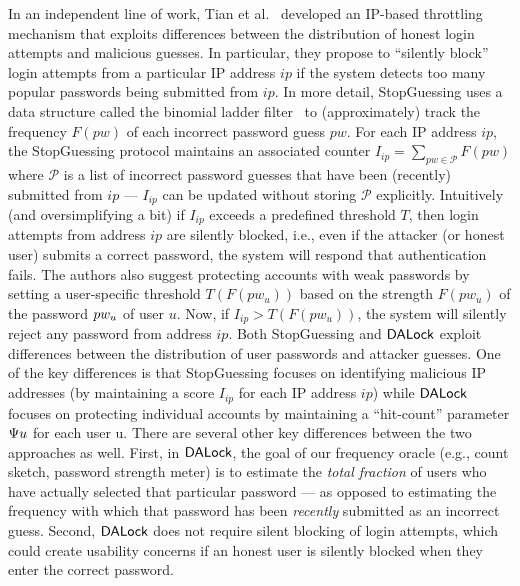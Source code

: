  In an independent line of work, Tian et al.~\cite{EuroSP:THS19} developed an IP-based throttling mechanism that exploits differences between the distribution of honest login attempts and malicious guesses. In particular, they propose to ``silently block'' login attempts from a particular IP address $ip$ if the system detects too many popular passwords being submitted from $ip$. In more detail, StopGuessing uses a data structure called the binomial ladder filter~\cite{SchHer:MSR18} to (approximately) track the frequency $F(pw)$ of each incorrect password guess $pw$. For each IP address $ip$, the StopGuessing protocol maintains an associated counter $I_{ip} = \displaystyle{\sum_{pw \in \mathcal{P}} F(pw)}$ where $\mathcal{P}$ is a list of incorrect password guesses that have been (recently) submitted from $ip$ --- $I_{ip} $ can be updated without storing $\mathcal{P}$ explicitly. Intuitively (and oversimplifying a bit) if $I_{ip}$ exceeds a predefined threshold $T$, then login attempts from address $ip$ are silently blocked, i.e., even if the attacker (or honest user) submits a correct password, the system will respond that authentication fails. The authors also suggest protecting accounts with weak passwords by setting a user-specific threshold $T(F(pw_{u}))$ based on the strength $F(pw_{u})$ of the password $pw_{u}$ of user $u$. Now, if $I_{ip} > T(F(pw_{u}))$, the system will silently reject any password from address $ip$. Both StopGuessing and $\mathsf{DALock}$ exploit differences between the distribution of user passwords and attacker guesses. One of the key differences is that StopGuessing focuses on identifying malicious IP addresses (by maintaining a score $I_{ip}$ for each IP address $ip$) while $\mathsf{DALock}$ focuses on protecting individual accounts by maintaining a ``hit-count'' parameter $\Psi{u}$ for each user u. There are several other key differences between the two approaches as well. First, in $\mathsf{DALock}$, the goal of our frequency oracle (e.g., count sketch, password strength meter) is to estimate the \textit{total fraction} of users who have actually selected that particular password --- as opposed to estimating the frequency with which that password has been {\em recently} submitted as an incorrect guess. Second, $\mathsf{DALock}$ does not require silent blocking of login attempts, which could create usability concerns if an honest user is silently blocked when they enter the correct password.  

\vspace{-0.2in}
